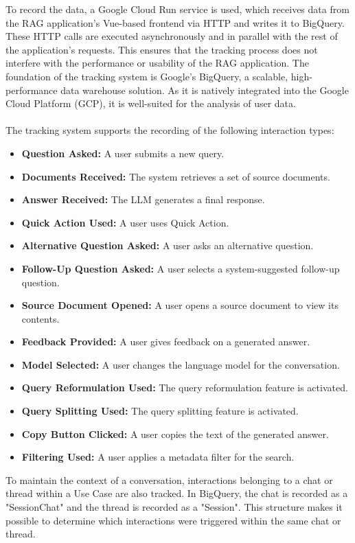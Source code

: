 \documentclass[
	english,
	ruledheaders=section,%
	class=report,%
	thesis={type=bachelor},%
	accentcolor=1b,%
	custommargins=true,%
	marginpar=false,%
	parskip=half-,%
	fontsize=11pt,%
	DIV=14,
]{tudapub}
\begin{document}
To record the data, a Google Cloud Run service \parencite{GoogleCloudRunService} is used, which receives data from the RAG application's Vue-based frontend via HTTP and writes it to BigQuery. These HTTP calls are executed asynchronously and in parallel with the rest of the application's requests. This ensures that the tracking process does not interfere with the performance or usability of the RAG application.
The foundation of the tracking system is Google's BigQuery, a scalable, high-performance data warehouse solution. As it is natively integrated into the Google Cloud Platform (GCP), it is well-suited for the analysis of user data.\\
\\
The tracking system supports the recording of the following interaction types:
\begin{itemize}
    \item \textbf{Question Asked:} A user submits a new query.
    \item \textbf{Documents Received:} The system retrieves a set of source documents.
    \item \textbf{Answer Received:} The LLM generates a final response.
    \item \textbf{Quick Action Used:} A user uses Quick Action.
    \item \textbf{Alternative Question Asked:} A user asks an alternative question.
    \item \textbf{Follow-Up Question Asked:} A user selects a system-suggested follow-up question.
    \item \textbf{Source Document Opened:} A user opens a source document to view its contents.
    \item \textbf{Feedback Provided:} A user gives feedback on a generated answer.
    \item \textbf{Model Selected:} A user changes the language model for the conversation.
    \item \textbf{Query Reformulation Used:} The query reformulation feature is activated.
    \item \textbf{Query Splitting Used:} The query splitting feature is activated.
    \item \textbf{Copy Button Clicked:} A user copies the text of the generated answer.
    \item \textbf{Filtering Used:} A user applies a metadata filter for the search.
\end{itemize}
To maintain the context of a conversation, interactions belonging to a chat or thread within a Use Case are also tracked. In BigQuery, the chat is recorded as a "SessionChat" and the thread is recorded as a "Session". This structure makes it possible to determine which interactions were triggered within the same chat or thread.
\end{document}
